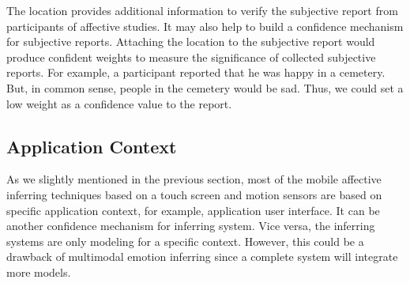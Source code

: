 The location provides additional information to verify the subjective report from participants of affective studies. It may also help to build a confidence mechanism \cite{tan2013connectivity} for subjective reports. Attaching the location to the subjective report would produce confident weights to measure the significance of collected subjective reports. For example, a participant reported that he was happy in a cemetery. But, in common sense, people in the cemetery would be sad. Thus, we could set a low weight as a confidence value to the report.

\subsection{Application Context}\label{subsec:ui}

As we slightly mentioned in the previous section, most of the mobile affective inferring techniques based on a touch screen and motion sensors\cite{Gao2012, Shah2015, Mottelson2016, bhattacharya2017predictive} are based on specific application context, for example, application user interface. It can be another confidence mechanism for inferring system. Vice versa, the inferring systems are only modeling for a specific context. However, this could be a drawback of multimodal emotion inferring since a complete system will integrate more models.
